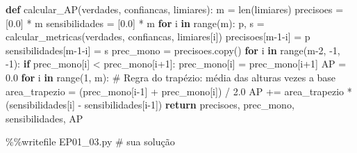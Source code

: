 \documentclass[
  portuguese,
  letterpaper,
  openany,
  oneside,
  12pt,
  a4paper]{book}
\newenvironment{Shaded}{\begin{snugshade}}{\end{snugshade}}
\newcommand{\BuiltInTok}[1]{\textcolor[rgb]{0.00,0.23,0.31}{#1}}
\newcommand{\CommentTok}[1]{\textcolor[rgb]{0.37,0.37,0.37}{#1}}
\newcommand{\ControlFlowTok}[1]{\textcolor[rgb]{0.00,0.23,0.31}{\textbf{#1}}}
\newcommand{\DecValTok}[1]{\textcolor[rgb]{0.68,0.00,0.00}{#1}}
\newcommand{\FloatTok}[1]{\textcolor[rgb]{0.68,0.00,0.00}{#1}}
\newcommand{\KeywordTok}[1]{\textcolor[rgb]{0.00,0.23,0.31}{\textbf{#1}}}
\newcommand{\NormalTok}[1]{\textcolor[rgb]{0.00,0.23,0.31}{#1}}
\newcommand{\OperatorTok}[1]{\textcolor[rgb]{0.37,0.37,0.37}{#1}}
\begin{document}
\begin{Shaded}
\begin{Highlighting}[]
\KeywordTok{def}\NormalTok{ calcular\_AP(verdades, confiancas, limiares):}
\NormalTok{    m }\OperatorTok{=} \BuiltInTok{len}\NormalTok{(limiares)}
\NormalTok{    precisoes }\OperatorTok{=}\NormalTok{ [}\FloatTok{0.0}\NormalTok{] }\OperatorTok{*}\NormalTok{ m}
\NormalTok{    sensibilidades }\OperatorTok{=}\NormalTok{ [}\FloatTok{0.0}\NormalTok{] }\OperatorTok{*}\NormalTok{ m}
    \ControlFlowTok{for}\NormalTok{ i }\KeywordTok{in} \BuiltInTok{range}\NormalTok{(m):}
\NormalTok{        p, s }\OperatorTok{=}\NormalTok{ calcular\_metricas(verdades, confiancas, limiares[i])}
\NormalTok{        precisoes[m}\OperatorTok{{-}}\DecValTok{1}\OperatorTok{{-}}\NormalTok{i] }\OperatorTok{=}\NormalTok{ p}
\NormalTok{        sensibilidades[m}\OperatorTok{{-}}\DecValTok{1}\OperatorTok{{-}}\NormalTok{i] }\OperatorTok{=}\NormalTok{ s}
\NormalTok{    prec\_mono }\OperatorTok{=}\NormalTok{ precisoes.copy()}
    \ControlFlowTok{for}\NormalTok{ i }\KeywordTok{in} \BuiltInTok{range}\NormalTok{(m}\OperatorTok{{-}}\DecValTok{2}\NormalTok{, }\OperatorTok{{-}}\DecValTok{1}\NormalTok{, }\OperatorTok{{-}}\DecValTok{1}\NormalTok{):}
        \ControlFlowTok{if}\NormalTok{ prec\_mono[i] }\OperatorTok{\textless{}}\NormalTok{ prec\_mono[i}\OperatorTok{+}\DecValTok{1}\NormalTok{]:}
\NormalTok{            prec\_mono[i] }\OperatorTok{=}\NormalTok{ prec\_mono[i}\OperatorTok{+}\DecValTok{1}\NormalTok{]}
\NormalTok{    AP }\OperatorTok{=} \FloatTok{0.0}
    \ControlFlowTok{for}\NormalTok{ i }\KeywordTok{in} \BuiltInTok{range}\NormalTok{(}\DecValTok{1}\NormalTok{, m):}
        \CommentTok{\# Regra do trapézio: média das alturas vezes a base}
\NormalTok{        area\_trapezio }\OperatorTok{=}\NormalTok{ (prec\_mono[i}\OperatorTok{{-}}\DecValTok{1}\NormalTok{] }\OperatorTok{+}\NormalTok{ prec\_mono[i]) }\OperatorTok{/} \FloatTok{2.0}
\NormalTok{        AP }\OperatorTok{+=}\NormalTok{ area\_trapezio }\OperatorTok{*}\NormalTok{ (sensibilidades[i] }\OperatorTok{{-}}\NormalTok{ sensibilidades[i}\OperatorTok{{-}}\DecValTok{1}\NormalTok{])}
    \ControlFlowTok{return}\NormalTok{ precisoes, prec\_mono, sensibilidades, AP}
\end{Highlighting}
\end{Shaded}

\begin{Shaded}
\begin{Highlighting}[]
\OperatorTok{\%\%}\NormalTok{writefile EP01\_03.py}
\CommentTok{\# sua solução}
\end{Highlighting}
\end{Shaded}
\end{document}
